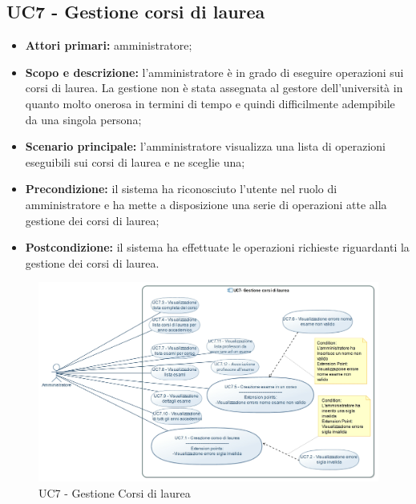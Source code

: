 \documentclass[AnalisiDeiRequisiti.tex]{subfiles}
\begin{document}
\subsection{UC7 - Gestione corsi di laurea}
\begin{itemize}
	\item \textbf{Attori primari:} amministratore;
	\item \textbf{Scopo e descrizione:} l'amministratore è in grado di eseguire operazioni sui corsi di laurea. La gestione non è stata assegnata al gestore dell'università in quanto molto onerosa in termini di tempo e quindi difficilmente adempibile da una singola persona;
	\item \textbf{Scenario principale:} l'amministratore visualizza una lista di operazioni eseguibili sui corsi di laurea e ne sceglie una;
	\item \textbf{Precondizione:} il sistema ha riconosciuto l'utente nel ruolo di amministratore e ha mette a disposizione una serie di operazioni atte alla gestione dei corsi di laurea; 
	\item \textbf{Postcondizione:} il sistema ha effettuate le operazioni richieste riguardanti la gestione dei corsi di laurea.
\end{itemize}

\begin{figure}[H]
	\centering
	\includegraphics[width=1.1\linewidth]{UC7.jpg}
	\caption{UC7 - Gestione Corsi di laurea}
	\label{fig:UC7 - Gestione Corsi di laurea}
\end{figure}
\end{document}
